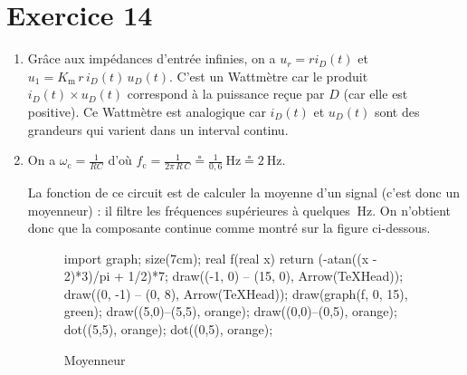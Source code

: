 \section{Exercice 14}

\begin{enumerate}
	\item Grâce aux impédances d'entrée infinies, on a $u_r = r i_D(t)$\/ et $u_1 = K_\text{m}\,r\,i_D(t)\,u_D(t)$. C'est un Wattmètre car le produit $i_D(t) \times u_D(t)$\/ correspond à la puissance reçue par $D$ (car elle est positive). Ce Wattmètre est analogique car $i_D(t)$\/ et $u_D(t)$\/ sont des grandeurs qui varient dans un interval continu.

	\item On a $\omega_\text{c} = \frac{1}{RC}$\/ d'où $f_\text{c} = \frac{1}{2\pi\,R\,C}\circeq \frac{1}{0{,}6}\:\mathrm{Hz} \circeq 2\:\mathrm{Hz}$.

		La fonction de ce circuit est de calculer la moyenne d'un signal (c'est donc un moyenneur) : il filtre les fréquences supérieures à quelques $\:\mathrm{Hz}$. On n'obtient donc que la composante continue comme montré sur la figure ci-dessous.

		\begin{figure}[H]
			\centering
			\begin{asy}
				import graph;
				size(7cm);
				real f(real x) { return (-atan((x - 2)*3)/pi + 1/2)*7; }
				draw((-1, 0) -- (15, 0), Arrow(TeXHead));
				draw((0, -1) -- (0, 8), Arrow(TeXHead));
				draw(graph(f, 0, 15), green);
				draw((5,0)--(5,5), orange);
				draw((0,0)--(0,5), orange);
				dot((5,5), orange);
				dot((0,5), orange);
			\end{asy}
			\caption{Moyenneur}
		\end{figure}
		

\end{enumerate}
